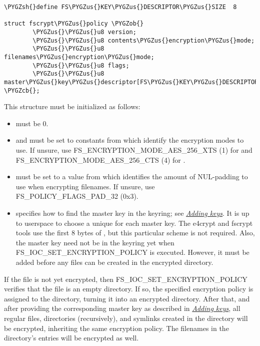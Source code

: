 \documentclass[a4paper,8pt,english]{sphinxmanual}
\def\PYGZus{\char`\_}
\def\PYGZob{\char`\{}
\def\PYGZcb{\char`\}}
\def\PYGZsh{\char`\#}
\begin{document}
\begin{Verbatim}[commandchars=\\\{\}]
\PYGZsh{}define FS\PYGZus{}KEY\PYGZus{}DESCRIPTOR\PYGZus{}SIZE  8

struct fscrypt\PYGZus{}policy \PYGZob{}
        \PYGZus{}\PYGZus{}u8 version;
        \PYGZus{}\PYGZus{}u8 contents\PYGZus{}encryption\PYGZus{}mode;
        \PYGZus{}\PYGZus{}u8 filenames\PYGZus{}encryption\PYGZus{}mode;
        \PYGZus{}\PYGZus{}u8 flags;
        \PYGZus{}\PYGZus{}u8 master\PYGZus{}key\PYGZus{}descriptor[FS\PYGZus{}KEY\PYGZus{}DESCRIPTOR\PYGZus{}SIZE];
\PYGZcb{};
\end{Verbatim}

This structure must be initialized as follows:
\begin{itemize}
\item {} 
 must be 0.

\item {} 
 and  must
be set to constants from  which identify the
encryption modes to use.  If unsure, use
FS\_ENCRYPTION\_MODE\_AES\_256\_XTS (1) for 
and FS\_ENCRYPTION\_MODE\_AES\_256\_CTS (4) for
.

\item {} 
 must be set to a value from  which
identifies the amount of NUL-padding to use when encrypting
filenames.  If unsure, use FS\_POLICY\_FLAGS\_PAD\_32 (0x3).

\item {} 
 specifies how to find the master key in
the keyring; see {\hyperref[filesystems/fscrypt:adding\string-keys]{\emph{Adding keys}}}.  It is up to userspace to choose a
unique  for each master key.  The e4crypt
and fscrypt tools use the first 8 bytes of
, but this particular scheme is not
required.  Also, the master key need not be in the keyring yet when
FS\_IOC\_SET\_ENCRYPTION\_POLICY is executed.  However, it must be added
before any files can be created in the encrypted directory.

\end{itemize}

If the file is not yet encrypted, then FS\_IOC\_SET\_ENCRYPTION\_POLICY
verifies that the file is an empty directory.  If so, the specified
encryption policy is assigned to the directory, turning it into an
encrypted directory.  After that, and after providing the
corresponding master key as described in {\hyperref[filesystems/fscrypt:adding\string-keys]{\emph{Adding keys}}}, all regular
files, directories (recursively), and symlinks created in the
directory will be encrypted, inheriting the same encryption policy.
The filenames in the directory's entries will be encrypted as well.
\end{document}
